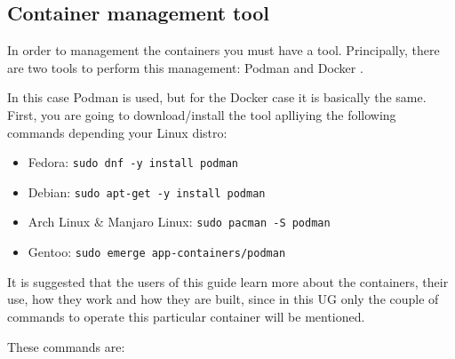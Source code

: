 \subsection{Container management tool}

In order to management the containers you must have a tool. 
Principally, there are two tools to perform this management: Podman \cite{podman} \cite{gh:podman} and Docker \cite{docker} \cite{gh:docker} \cite{gh:moby}.

\vspace{5mm}

\noindent In this case Podman is used, but for the Docker case it is basically the same.
First, you are going to download/install the tool aplliying the following commands depending your Linux distro:

\begin{itemize}
\item Fedora: \texttt{sudo dnf -y install podman}
\item Debian: \texttt{sudo apt-get -y install podman}
\item Arch Linux \& Manjaro Linux: \texttt{sudo pacman -S podman}
\item Gentoo: \texttt{sudo emerge app-containers/podman}
\end{itemize}

\noindent It is suggested that the users of this guide learn more about the containers, their use, how they work and how they are built, since in this UG only the couple of commands to operate this particular container \cite{gh:container-implarty} will be mentioned.

\vspace{5mm}

\noindent These commands are:

